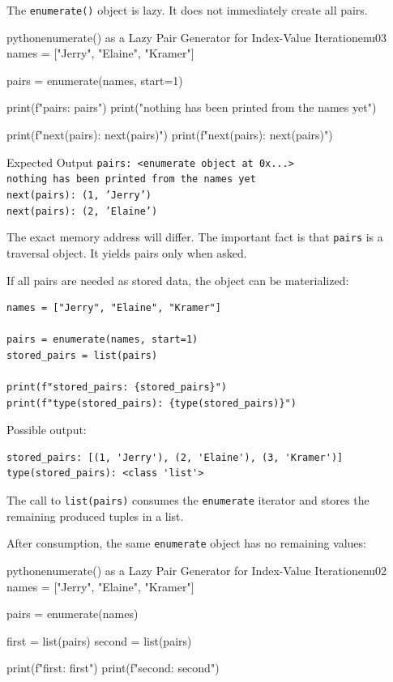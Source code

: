 The \texttt{enumerate()} object is lazy. It does not immediately create all pairs.

\begin{codebox}[]{python}{enumerate() as a Lazy Pair Generator for Index-Value Iteration}{enu03}
names = ["Jerry", "Elaine", "Kramer"]

pairs = enumerate(names, start=1)

print(f"pairs: {pairs}")
print("nothing has been printed from the names yet")

print(f"next(pairs): {next(pairs)}")
print(f"next(pairs): {next(pairs)}")
\end{codebox}


\begin{iobox}{Expected Output}
\texttt{pairs: <enumerate object at 0x...>} \\
\texttt{nothing has been printed from the names yet} \\
\texttt{next(pairs): (1, 'Jerry')} \\
\texttt{next(pairs): (2, 'Elaine')} \\
\end{iobox}


The exact memory address will differ. The important fact is that \texttt{pairs} is a traversal object. It yields pairs only when asked.

If all pairs are needed as stored data, the object can be materialized:

\begin{verbatim}
names = ["Jerry", "Elaine", "Kramer"]

pairs = enumerate(names, start=1)
stored_pairs = list(pairs)

print(f"stored_pairs: {stored_pairs}")
print(f"type(stored_pairs): {type(stored_pairs)}")
\end{verbatim}

Possible output:

\begin{verbatim}
stored_pairs: [(1, 'Jerry'), (2, 'Elaine'), (3, 'Kramer')]
type(stored_pairs): <class 'list'>
\end{verbatim}

The call to \texttt{list(pairs)} consumes the \texttt{enumerate} iterator and stores the remaining produced tuples in a list.

After consumption, the same \texttt{enumerate} object has no remaining values:

\begin{codebox}[]{python}{enumerate() as a Lazy Pair Generator for Index-Value Iteration}{enu02}
names = ["Jerry", "Elaine", "Kramer"]

pairs = enumerate(names)

first = list(pairs)
second = list(pairs)

print(f"first: {first}")
print(f"second: {second}")
\end{codebox}


